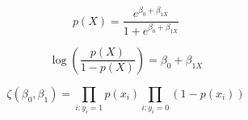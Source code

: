 \documentclass[10pt]{book}
\begin{document}
\begin{mdSnippets}
\begin{mdDisplaySnippet}[fa844e2e7d8c97568d2d0301d5147257]%
\[%
p(X)=\frac{e^{\beta_0+\beta_{1X}}}{1+e^{\beta_0+\beta_{1X}}}
\]%
\end{mdDisplaySnippet}%
\begin{mdDisplaySnippet}%
\[%
\log(\frac{p(X)}{1-p(X)}) = \beta_0+\beta_{1X}
\]%
\end{mdDisplaySnippet}%
\begin{mdDisplaySnippet}[3434640df0abf3c9138498896d5d4bb3]%
\[%
  \zeta(\beta_0,\beta_1)= \prod_{i:y_i=1}p(x_i)\prod_{i:y_i=0}(1-p(x_i))
\]%
\end{mdDisplaySnippet}%
\begin{mdDisplaySnippet}[23b58def11b45727d3351702515f86af]%
\[%
  
\]%
\end{mdDisplaySnippet}%

\end{mdSnippets}
\end{document}
